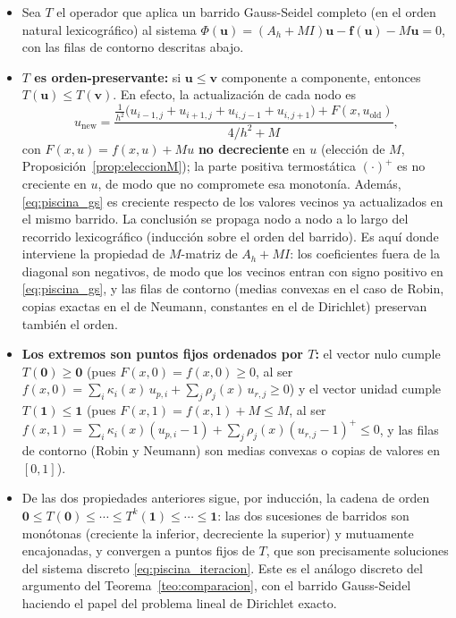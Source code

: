 \begin{itemize}
\begin{itemize}
  \item Sea $T$ el operador que aplica un barrido Gauss-Seidel completo (en el
  orden natural lexicográfico) al sistema $\Phi(\mathbf{u}) =
  (A_h + M I)\mathbf{u} - \mathbf{f}(\mathbf{u}) - M \mathbf{u} = 0$, con las
  filas de contorno descritas abajo.
  \item \textbf{$T$ es orden-preservante:} si $\mathbf{u} \leq \mathbf{v}$
  componente a componente, entonces $T(\mathbf{u}) \leq T(\mathbf{v})$. En
  efecto, la actualización de cada nodo es
  \begin{equation}\label{eq:piscina_gs}
    u_{\mathrm{new}} = \frac{\frac{1}{h^{2}}
      \bigl(u_{i-1,j} + u_{i+1,j} + u_{i,j-1} + u_{i,j+1}\bigr)
      + F(x, u_{\mathrm{old}})}{4/h^{2} + M},
  \end{equation}
  con $F(x,u) = f(x,u) + M u$ \textbf{no decreciente} en $u$ (elección de $M$,
  Proposición~\ref{prop:eleccionM}); la parte positiva termostática $(\cdot)^{+}$ es no
  creciente en $u$, de modo que no compromete esa monotonía. Además,
  \eqref{eq:piscina_gs} es creciente respecto de los valores vecinos ya
  actualizados en el mismo barrido. La conclusión se propaga nodo a
  nodo a lo largo del recorrido lexicográfico (inducción sobre el orden del
  barrido). Es aquí donde interviene la propiedad de $M$-matriz de $A_h + MI$:
  los coeficientes fuera de la diagonal son negativos, de modo que los vecinos
  entran con signo positivo en \eqref{eq:piscina_gs}, y las filas de contorno
  (medias convexas en el caso de Robin, copias exactas en el de Neumann,
  constantes en el de Dirichlet) preservan también el orden.
  \item \textbf{Los extremos son puntos fijos ordenados por $T$:} el vector
  nulo cumple $T(\mathbf{0}) \geq \mathbf{0}$ (pues $F(x,0) = f(x,0) \geq 0$, al ser
  $f(x,0) = \sum_i \kappa_i(x)\,u_{p,i} + \sum_j \rho_j(x)\,u_{r,j} \geq 0$) y el
  vector unidad cumple $T(\mathbf{1}) \leq
  \mathbf{1}$ (pues $F(x,1) = f(x,1) + M \leq M$, al ser
  $f(x,1) = \sum_i \kappa_i(x)(u_{p,i} - 1) + \sum_j \rho_j(x)(u_{r,j}-1)^{+} \leq 0$, y las filas de contorno
  (Robin y Neumann) son medias convexas o copias de valores en $[0,1]$).
  \item De las dos propiedades anteriores sigue, por inducción, la cadena de
  orden $\mathbf{0} \leq T(\mathbf{0}) \leq \cdots \leq T^{k}(\mathbf{1}) \leq
  \cdots \leq \mathbf{1}$: las dos sucesiones de barridos son monótonas
  (creciente la inferior, decreciente la superior) y mutuamente encajonadas,
  y convergen a puntos fijos de $T$, que son precisamente soluciones del
  sistema discreto \eqref{eq:piscina_iteracion}. Este es el análogo discreto
  del argumento del Teorema~\ref{teo:comparacion}, con el barrido
  Gauss-Seidel haciendo el papel del problema lineal de Dirichlet exacto.
\end{itemize}


\end{itemize}
